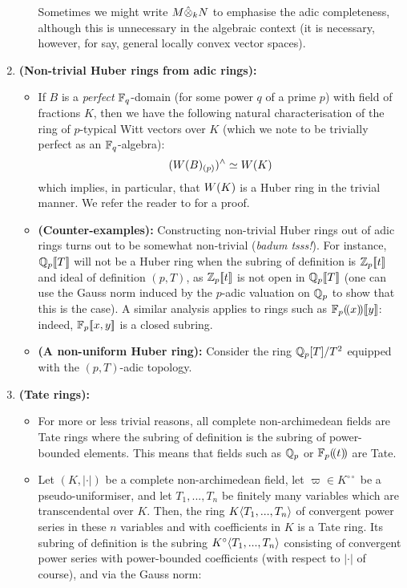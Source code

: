 \begin{example}
\begin{enumerate}
\begin{itemize}
                                Sometimes we might write $M \hat{\tensor}_k N$ to emphasise the adic completeness, although this is unnecessary in the algebraic context (it is necessary, however, for say, general locally convex vector spaces). 
                            \end{itemize}
                        \item \textbf{(Non-trivial Huber rings from adic rings):}
                            \begin{itemize}
                                \item If $B$ is a \textit{perfect} $\mathbb{F}_q$-domain (for some power $q$ of a prime $p$) with field of fractions $K$, then we have the following natural characterisation of the ring of $p$-typical Witt vectors over $K$ (which we note to be trivially perfect as an $\mathbb{F}_q$-algebra):
                                    $$(W(B)_{(p)})^{\wedge} \simeq W(K)$$
                                which implies, in particular, that $W(K)$ is a Huber ring in the trivial manner. We refer the reader to \cite[Proposition 5.2]{shimomoto2014witt} for a proof. 
                                \item \textbf{(Counter-examples):} Constructing non-trivial Huber rings out of adic rings turns out to be somewhat non-trivial (\textit{badum tsss!}). For instance, $\mathbb{Q}_p[\![T]\!]$ will not be a Huber ring when the subring of definition is $\mathbb{Z}_p[\![t]\!]$ and ideal of definition $(p, T)$, as $\mathbb{Z}_p[\![t]\!]$ is not open in $\mathbb{Q}_p[\![T]\!]$ (one can use the Gauss norm induced by the $p$-adic valuation on $\mathbb{Q}_p$ to show that this is the case). A similar analysis applies to rings such as $\mathbb{F}_p(\!(x)\!)[\![y]\!]$: indeed, $\mathbb{F}_p[\![x, y]\!]$ is a closed subring. 
                                \item \textbf{(A non-uniform Huber ring):} Consider the ring $\mathbb{Q}_p[T]/T^2$ equipped with the $(p, T)$-adic topology. 
                            \end{itemize}
                        \item \textbf{(Tate rings):} 
                            \begin{itemize}
                                \item For more or less trivial reasons, all complete non-archimedean fields are Tate rings where the subring of definition is the subring of power-bounded elements. This means that fields such as $\mathbb{Q}_p$ or $\mathbb{F}_p(\!(t)\!)$ are Tate.
                                \item Let $(K, |\cdot|)$ be a complete non-archimedean field, let $\varpi \in K^{\circ \circ}$ be a pseudo-uniformiser, and let $T_1, ..., T_n$ be finitely many variables which are transcendental over $K$. Then, the ring $K\langle T_1, ..., T_n\rangle$ of convergent power series in these $n$ variables and with coefficients in $K$ is a Tate ring. Its subring of definition is the subring $K^{\circ}\langle T_1, ..., T_n\rangle$ consisting of convergent power series with power-bounded coefficients (with respect to $|\cdot|$ of course), and via the Gauss norm:

\end{itemize}
\end{enumerate}
\end{example}
